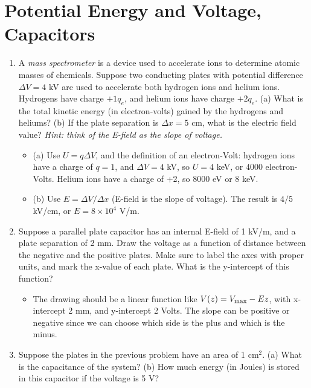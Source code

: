 \documentclass[10pt]{article}
\begin{document}
\section{Potential Energy and Voltage, Capacitors}

\begin{enumerate}
\item A \textit{mass spectrometer} is a device used to accelerate ions to determine atomic masses of chemicals.  Suppose two conducting plates with potential difference $\Delta V = 4$ kV are used to accelerate both hydrogen ions and helium ions.  Hydrogens have charge $+1 q_e$, and helium ions have charge $+2 q_e$.  (a) What is the total kinetic energy (in electron-volts) gained by the hydrogens and heliums? (b) If the plate separation is $\Delta x = 5$ cm, what is the electric field value?  \textit{Hint: think of the E-field as the slope of voltage.} \\
\begin{itemize}
\item (a) Use $U = q\Delta V$, and the definition of an electron-Volt: hydrogen ions have a charge of $q = 1$, and $\Delta V = 4$ kV, so $U = 4$ keV, or $4000$ electron-Volts.  Helium ions have a charge of +2, so $8000$ eV or $8$ keV.
\item (b) Use $E = \Delta V / \Delta x$ (E-field is the slope of voltage).  The result is $4/5$ kV/cm, or $E = 8 \times 10^4$ V/m.
\end{itemize}
\item Suppose a parallel plate capacitor has an internal E-field of 1 kV/m, and a plate separation of 2 mm.  Draw the voltage as a function of distance between the negative and the positive plates.  Make sure to label the axes with proper units, and mark the x-value of each plate.  What is the y-intercept of this function? \\
\begin{itemize}
\item The drawing should be a linear function like $V(z) = V_{\rm max} - E z$, with x-intercept 2 mm, and y-intercept 2 Volts.  The slope can be positive or negative since we can choose which side is the plus and which is the minus.
\end{itemize}
\item Suppose the plates in the previous problem have an area of 1 cm$^2$.  (a) What is the capacitance of the system? (b) How much energy (in Joules) is stored in this capacitor if the voltage is 5 V? \\
\begin{itemize}

\end{itemize}
\end{enumerate}
\end{document}
